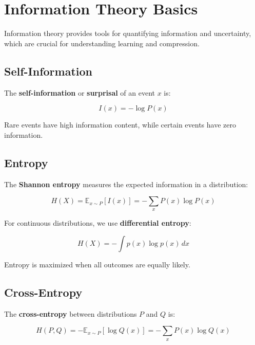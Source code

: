 
\section{Information Theory Basics }
\label{sec:information-theory}

Information theory provides tools for quantifying information and uncertainty, which are crucial for understanding learning and compression.

\subsection{Self-Information}

The \textbf{self-information} or \textbf{surprisal} of an event $x$ is:

\begin{equation}
I(x) = -\log P(x)
\end{equation}

Rare events have high information content, while certain events have zero information.

\subsection{Entropy}

The \textbf{Shannon entropy} measures the expected information in a distribution:

\begin{equation}
H(X) = \mathbb{E}_{x \sim P}[I(x)] = -\sum_{x} P(x) \log P(x)
\end{equation}

For continuous distributions, we use \textbf{differential entropy}:

\begin{equation}
H(X) = -\int p(x) \log p(x) \, dx
\end{equation}

Entropy is maximized when all outcomes are equally likely.

\subsection{Cross-Entropy}

The \textbf{cross-entropy} between distributions $P$ and $Q$ is:

\begin{equation}
H(P, Q) = -\mathbb{E}_{x \sim P}[\log Q(x)] = -\sum_{x} P(x) \log Q(x)
\end{equation}

